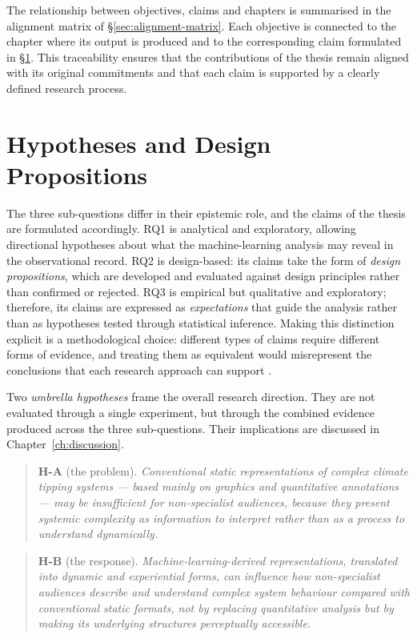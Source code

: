 The relationship between objectives, claims and chapters is summarised in the alignment matrix of \S\ref{sec:alignment-matrix}. Each objective is connected to the chapter where its output is produced and to the corresponding claim formulated in \S\ref{sec:hypotheses}. This traceability ensures that the contributions of the thesis remain aligned with its original commitments and that each claim is supported by a clearly defined research process.

\section{Hypotheses and Design Propositions}
\label{sec:hypotheses}

The three sub-questions differ in their epistemic role, and the claims of the thesis are formulated accordingly. RQ1 is analytical and exploratory, allowing directional hypotheses about what the machine-learning analysis may reveal in the observational record. RQ2 is design-based: its claims take the form of \emph{design propositions}, which are developed and evaluated against design principles rather than confirmed or rejected. RQ3 is empirical but qualitative and exploratory; therefore, its claims are expressed as \emph{expectations} that guide the analysis rather than as hypotheses tested through statistical inference. Making this distinction explicit is a methodological choice: different types of claims require different forms of evidence, and treating them as equivalent would misrepresent the conclusions that each research approach can support \citep{cronbach1975, mckenney2018}.

Two \emph{umbrella hypotheses} frame the overall research direction. They are not evaluated through a single experiment, but through the combined evidence produced across the three sub-questions. Their implications are discussed in Chapter~\ref{ch:discussion}.

\begin{quote}
\textbf{H-A} (the problem). \emph{Conventional static representations of complex climate tipping systems --- based mainly on graphics and quantitative annotations --- may be insufficient for non-specialist audiences, because they present systemic complexity as information to interpret rather than as a process to understand dynamically.}
\end{quote}

\begin{quote}
\textbf{H-B} (the response). \emph{Machine-learning-derived representations, translated into dynamic and experiential forms, can influence how non-specialist audiences describe and understand complex system behaviour compared with conventional static formats, not by replacing quantitative analysis but by making its underlying structures perceptually accessible.}
\end{quote}

